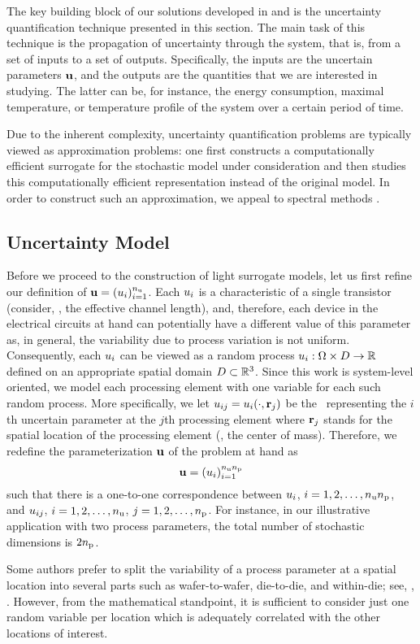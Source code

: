 The key building block of our solutions developed in  and  is the uncertainty quantification technique presented in this section.
The main task of this technique is the propagation of uncertainty through the system, that is, from a set of inputs to a set of outputs.
Specifically, the inputs are the uncertain parameters $\mathbf{u}$, and the outputs are the quantities that we are interested in studying.
The latter can be, for instance, the energy consumption, maximal temperature, or temperature profile of the system over a certain period of time.

Due to the inherent complexity, uncertainty quantification problems are typically viewed as approximation problems: one first constructs a computationally efficient surrogate for the stochastic model under consideration and then studies this computationally efficient representation instead of the original model.
In order to construct such an approximation, we appeal to spectral methods \cite{maitre2010, janson1997, eldred2008}.

\subsection{Uncertainty Model}
Before we proceed to the construction of light surrogate models, let us first refine our definition of $\mathbf{u} = (u_i)_{i = 1}^{n_\text{u}}$.
Each $u_i$ is a characteristic of a single transistor (consider, \eg, the effective channel length), and, therefore, each device in the electrical circuits at hand can potentially have a different value of this parameter as, in general, the variability due to process variation is not uniform.
Consequently, each $u_i$ can be viewed as a random process $u_i: \Omega \times D \to \mathbb{R}$ defined on an appropriate spatial domain $D \subset \mathbb{R}^3$.
Since this work is system-level oriented, we model each processing element with one variable for each such random process.
More specifically, we let $u_{ij} = u_i(\cdot, \mathbf{r}_j)$ be the \rv\ representing the $i$th uncertain parameter at the $j$th processing element where $\mathbf{r}_j$ stands for the spatial location of the processing element (\eg, the center of mass).
Therefore, we redefine the parameterization $\mathbf{u}$ of the problem at hand as
\begin{equation} \elab{uncertain-parameters}
  \vu = (\u_i)_{i = 1}^{\nparams \nprocs}
\end{equation}
such that there is a one-to-one correspondence between $u_i$, $i = 1, 2, \dots, {n_\text{u}} {n_\text{p}}$, and $u_{ij}$, $i = 1, 2, \dots, {n_\text{u}}$, $j = 1, 2, \dots, {n_\text{p}}$.
For instance, in our illustrative application with two process parameters, the total number of stochastic dimensions is $2 {n_\text{p}}$.
\begin{remark}
Some authors prefer to split the variability of a process parameter at a spatial location into several parts such as wafer-to-wafer, die-to-die, and within-die; see, \eg, \cite{juan2012}.
However, from the mathematical standpoint, it is sufficient to consider just one random variable per location which is adequately correlated with the other locations of interest.
\end{remark}

